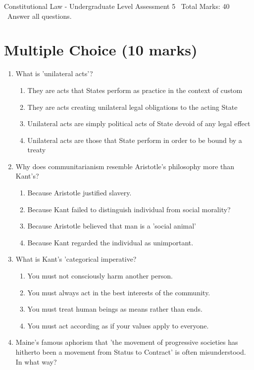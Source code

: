 \documentclass[12pt]{article}
\begin{document}
\begin{center}
Constitutional Law - Undergraduate Level Assessment 5 \
Total Marks: 40 \
Answer all questions.
\end{center}

\section*{Multiple Choice (10 marks)}
\begin{enumerate}[label=\arabic*.]
\item What is 'unilateral acts'?
\begin{enumerate}[label=(\alph*)]
    \item They are acts that States perform as practice in the context of custom
    \item They are acts creating unilateral legal obligations to the acting State
    \item Unilateral acts are simply political acts of State devoid of any legal effect
    \item Unilateral acts are those that State perform in order to be bound by a treaty
\end{enumerate}
\item Why does communitarianism resemble Aristotle's philosophy more than Kant's?
\begin{enumerate}[label=(\alph*)]
    \item Because Aristotle justified slavery.
    \item Because Kant failed to distinguish individual from social morality?
    \item Because Aristotle believed that man is a 'social animal'
    \item Because Kant regarded the individual as unimportant.
\end{enumerate}
\item What is Kant's 'categorical imperative?
\begin{enumerate}[label=(\alph*)]
    \item You must not consciously harm another person.
    \item You must always act in the best interests of the community.
    \item You must treat human beings as means rather than ends.
    \item You must act according as if your values apply to everyone.
\end{enumerate}
\item Maine's famous aphorism that 'the movement of progressive societies has hitherto been a movement from Status to Contract' is often misunderstood. In what way?

\end{enumerate}
\end{document}
